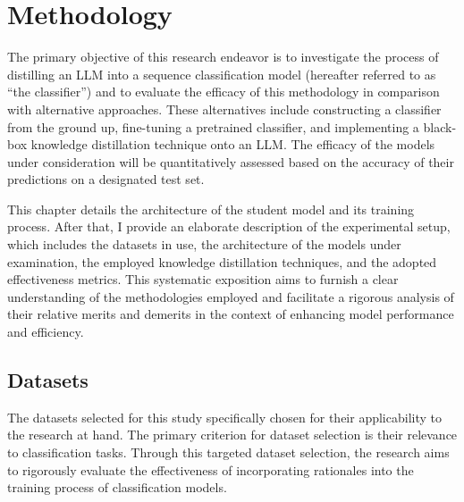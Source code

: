 \chapter{Methodology}
\label{chap:met}

The primary objective of this research endeavor is to investigate the process of distilling an LLM into a sequence classification model (hereafter referred to as ``the classifier'') and to evaluate the efficacy of this methodology in comparison with alternative approaches. These alternatives include constructing a classifier from the ground up, fine-tuning a pretrained classifier, and implementing a black-box knowledge distillation technique onto an LLM\@. The efficacy of the models under consideration will be quantitatively assessed based on the accuracy of their predictions on a designated test set.

This chapter details the architecture of the student model and its training process. After that, I provide an elaborate description of the experimental setup, which includes the datasets in use, the architecture of the models under examination, the employed knowledge distillation techniques, and the adopted effectiveness metrics. This systematic exposition aims to furnish a clear understanding of the methodologies employed and facilitate a rigorous analysis of their relative merits and demerits in the context of enhancing model performance and efficiency.


\section{Datasets}

The datasets selected for this study specifically chosen for their applicability to the research at hand. The primary criterion for dataset selection is their relevance to classification tasks. Through this targeted dataset selection, the research aims to rigorously evaluate the effectiveness of incorporating rationales into the training process of classification models.

